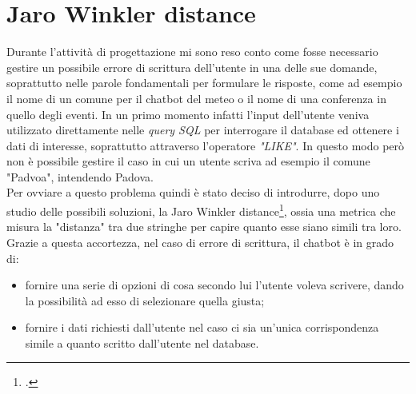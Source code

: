 \section{Jaro Winkler distance}
Durante l'attività di progettazione mi sono reso conto come fosse necessario gestire un possibile errore di scrittura dell'utente in una delle sue domande, soprattutto nelle parole fondamentali per formulare le risposte, come ad esempio il nome di un comune per il \gls{chatbot} del meteo o il nome di una conferenza in quello degli eventi. In un primo momento infatti l'input dell'utente veniva utilizzato direttamente nelle \emph{query SQL} per interrogare il database ed ottenere i dati di interesse, soprattutto attraverso l'operatore \emph{"LIKE"}. In questo modo però non è possibile gestire il caso in cui un utente scriva ad esempio il comune "Padvoa", intendendo Padova. \\
Per ovviare a questo problema quindi è stato deciso di introdurre, dopo uno studio delle possibili soluzioni, la Jaro Winkler distance\footcite{jaro}, ossia una metrica che misura la "distanza" tra due stringhe per capire quanto esse siano simili tra loro. Grazie a questa accortezza, nel caso di errore di scrittura, il \gls{chatbot} è in grado di:
\begin{itemize}
	\item fornire una serie di opzioni di cosa secondo lui l'utente voleva scrivere, dando la possibilità ad esso di selezionare quella giusta;
	\item fornire i dati richiesti dall'utente nel caso ci sia un'unica corrispondenza simile a quanto scritto dall'utente nel database.
\end{itemize}